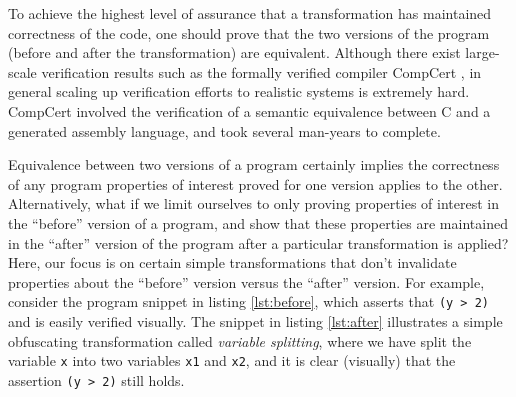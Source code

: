 \documentclass[compsoc,conference,a4paper,10pt,times]{IEEEtran}
\begin{document}
To achieve the highest level of assurance that a transformation has maintained correctness of the code, one should prove that the two versions of the program (before and after the transformation) are equivalent. Although there exist large-scale verification results such as the formally verified compiler CompCert \cite{CompCert}, in general scaling up verification efforts to realistic systems is extremely hard. CompCert involved the verification of a semantic equivalence between C and a generated assembly language, and took several man-years to complete. 

%
Equivalence between two versions of a program certainly implies the correctness of any program properties of interest proved for one version applies to the other.  Alternatively, what if we limit ourselves to only proving properties of interest in the ``before'' version of a program, and show that these properties are maintained in the ``after'' version of the program after a particular transformation is applied? 
%
Here, our focus is on certain simple transformations that don't invalidate properties about the ``before'' version versus the ``after'' version.  For example, consider the program snippet in listing \ref{lst:before}, which asserts that \texttt{(y > 2)} and is easily verified visually. The snippet in listing \ref{lst:after} illustrates a simple obfuscating transformation called \emph{variable splitting}, where we have split the variable \texttt{x} into two  variables \texttt{x1} and \texttt{x2}, and it is clear (visually) that the assertion \texttt{(y > 2)} still holds.
\end{document}
